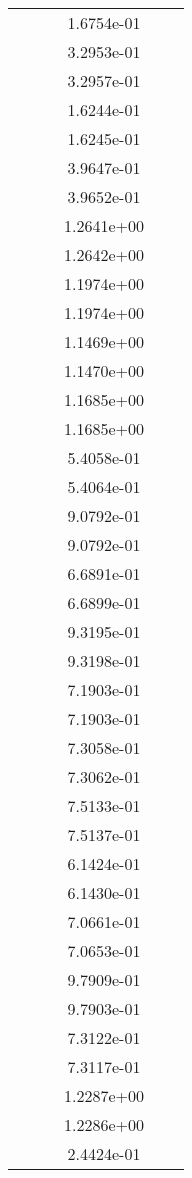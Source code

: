 \begin{xltabular}{\textwidth}{r|rS[table-format=1.3e+2]S[table-format=1.4e+2]S[table-format=1.4e+2]S[table-format=-1.5]}
&  &  & 1.6754e-01 & & \\
&  &  & 3.2953e-01 & & \\
&  &  & 3.2957e-01 & & \\
&  &  & 1.6244e-01 & & \\
&  &  & 1.6245e-01 & & \\
&  &  & 3.9647e-01 & & \\
&  &  & 3.9652e-01 & & \\
&  &  & 1.2641e+00 & & \\
&  &  & 1.2642e+00 & & \\
&  &  & 1.1974e+00 & & \\
&  &  & 1.1974e+00 & & \\
&  &  & 1.1469e+00 & & \\
&  &  & 1.1470e+00 & & \\
&  &  & 1.1685e+00 & & \\
&  &  & 1.1685e+00 & & \\
&  &  & 5.4058e-01 & & \\
&  &  & 5.4064e-01 & & \\
&  &  & 9.0792e-01 & & \\
&  &  & 9.0792e-01 & & \\
&  &  & 6.6891e-01 & & \\
&  &  & 6.6899e-01 & & \\
&  &  & 9.3195e-01 & & \\
&  &  & 9.3198e-01 & & \\
&  &  & 7.1903e-01 & & \\
&  &  & 7.1903e-01 & & \\
&  &  & 7.3058e-01 & & \\
&  &  & 7.3062e-01 & & \\
&  &  & 7.5133e-01 & & \\
&  &  & 7.5137e-01 & & \\
&  &  & 6.1424e-01 & & \\
&  &  & 6.1430e-01 & & \\
&  &  & 7.0661e-01 & & \\
&  &  & 7.0653e-01 & & \\
&  &  & 9.7909e-01 & & \\
&  &  & 9.7903e-01 & & \\
&  &  & 7.3122e-01 & & \\
&  &  & 7.3117e-01 & & \\
&  &  & 1.2287e+00 & & \\
&  &  & 1.2286e+00 & & \\
&  &  & 2.4424e-01 & & \\

\end{xltabular}
